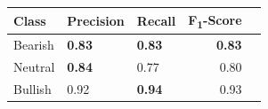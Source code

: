 \documentclass[11pt, a4paper]{article}
\begin{document}
\begin{table}[!htb]
\begin{tabular}{lllrr}
                                        \cmidrule{2-4}
                            Class       & Precision     & Recall    & F\textsubscript{1}-Score \\
            \midrule
            \multirow{1}{*}{Bearish}       & \textbf{0.83}          & \textbf{0.83}      & \textbf{0.83}                      \\
            \midrule
            \multirow{1}{*}{Neutral}       & \textbf{0.84}         & 0.77      & 0.80                      \\
            \midrule
            \multirow{1}{*}{Bullish}       & 0.92          & \textbf{0.94}      & 0.93                      \\
        \bottomrule
    \end{tabular}

\end{table}
\newpage
\end{document}

